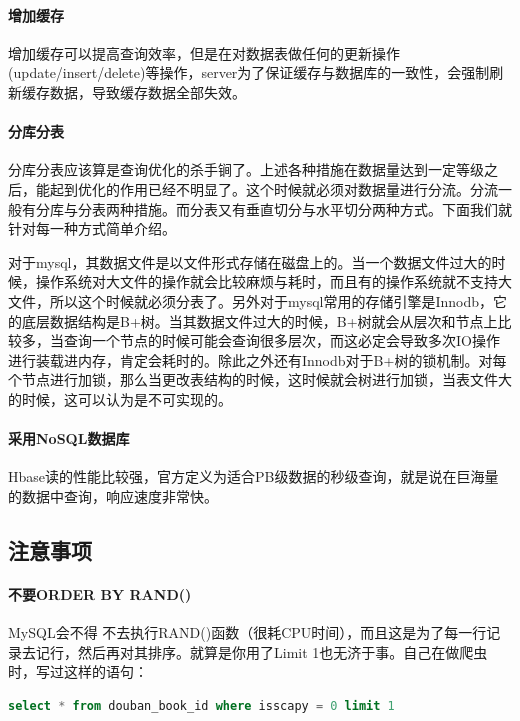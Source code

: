 \documentclass[letter]{book}
\begin{document}
\paragraph{增加缓存}增加缓存可以提高查询效率，但是在对数据表做任何的更新操作(update/insert/delete)等操作，server为了保证缓存与数据库的一致性，会强制刷新缓存数据，导致缓存数据全部失效。

\paragraph{分库分表}分库分表应该算是查询优化的杀手锏了。上述各种措施在数据量达到一定等级之后，能起到优化的作用已经不明显了。这个时候就必须对数据量进行分流。分流一般有分库与分表两种措施。而分表又有垂直切分与水平切分两种方式。下面我们就针对每一种方式简单介绍。

对于mysql，其数据文件是以文件形式存储在磁盘上的。当一个数据文件过大的时候，操作系统对大文件的操作就会比较麻烦与耗时，而且有的操作系统就不支持大文件，所以这个时候就必须分表了。另外对于mysql常用的存储引擎是Innodb，它的底层数据结构是B+树。当其数据文件过大的时候，B+树就会从层次和节点上比较多，当查询一个节点的时候可能会查询很多层次，而这必定会导致多次IO操作进行装载进内存，肯定会耗时的。除此之外还有Innodb对于B+树的锁机制。对每个节点进行加锁，那么当更改表结构的时候，这时候就会树进行加锁，当表文件大的时候，这可以认为是不可实现的。

\paragraph{采用NoSQL数据库}

Hbase读的性能比较强，官方定义为适合PB级数据的秒级查询，就是说在巨海量的数据中查询，响应速度非常快。

\subsection{注意事项}

\paragraph{不要ORDER BY RAND()}MySQL会不得 不去执行RAND()函数（很耗CPU时间），而且这是为了每一行记录去记行，然后再对其排序。就算是你用了Limit 1也无济于事。自己在做爬虫时，写过这样的语句：

\begin{lstlisting}[language=SQL]
select * from douban_book_id where isscapy = 0 limit 1
\end{lstlisting}
\end{document}
